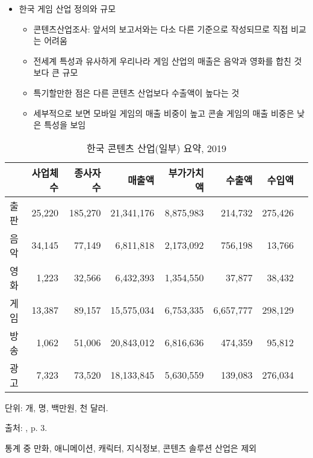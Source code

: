 \begin{itemize}
\item 한국 게임 산업 정의와 규모
	\begin{itemize}
	\item 콘텐츠산업조사: 앞서의 보고서와는 다소 다른 기준으로 작성되므로 직접 비교는 어려움	
	\item 전세계 특성과 유사하게 우리나라 게임 산업의 매출은 음악과 영화를 합친 것보다 큰 규모
	\item 특기할만한 점은 다른 콘텐츠 산업보다 수출액이 높다는 것
	\item 세부적으로 보면 모바일 게임의 매출 비중이 높고 콘솔 게임의 매출 비중은 낮은 특성을 보임
	\end{itemize}
\end{itemize}

			\begin{table}[htp]
			\begin{center}
			\begin{threeparttable}
			\caption{한국 콘텐츠 산업(일부) 요약, 2019}\label{tab:koreancontentsmarket}
			\begin{tabularx}{\textwidth}{lrrrrrrr}
			\toprule
			& 사업체 수 & 종사자 수 & 매출액 & 부가가치액 & 수출액 & 수입액 \\
			\midrule
			출판 & 25,220 & 185,270 & 21,341,176 & 8,875,983 & 214,732 & 275,426 \\
			음악 & 34,145 &  77,149 & 6,811,818 & 2,173,092 & 756,198 & 13,766 \\
			영화 & 1,223 & 32,566 & 6,432,393 & 1,354,550 & 37,877 & 38,432 \\
			게임 & 13,387 & 89,157 & 15,575,034 & 6,753,335 & 6,657,777 & 298,129 \\
			방송 & 1,062 & 51,006 & 20,843,012 & 6,816,636 & 474,359 & 95,812 \\
			광고 &  7,323 & 73,520 & 18,133,845 & 5,630,559 & 139,083 & 276,034 \\
			\bottomrule
			\end{tabularx}
			\begin{tablenotes}
			\small
			\item 단위: 개, 명, 백만원, 천 달러.
			\item 출처: \cite{munhwacheyuggwangwangbu:2021wo}, p. 3.
			\item 통계 중 만화, 애니메이션, 캐릭터, 지식정보, 콘텐츠 솔루션 산업은 제외
			\end{tablenotes}
			\end{threeparttable}
			\end{center}
			\end{table}%
	
